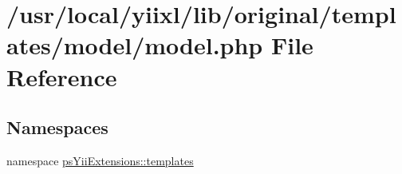 \hypertarget{templates_2model_2model_8php}{
\section{/usr/local/yiixl/lib/original/templates/model/model.php File Reference}
\label{templates_2model_2model_8php}
}
\subsection*{Namespaces}
\begin{DoxyCompactItemize}
\item 
namespace \hyperlink{namespacepsYiiExtensions_1_1templates}{psYiiExtensions::templates}
\end{DoxyCompactItemize}

